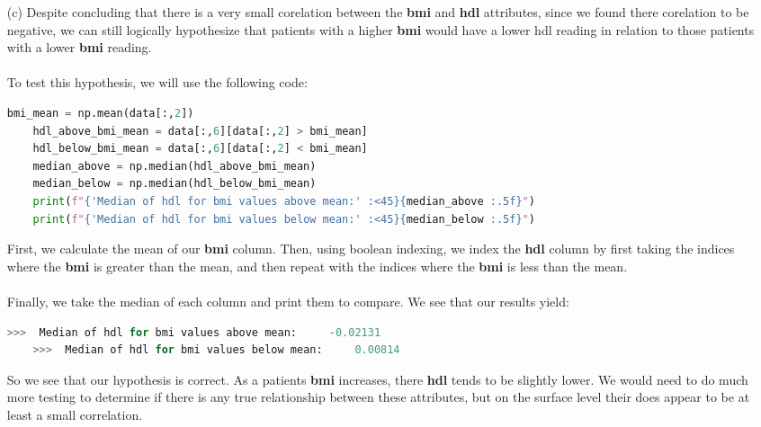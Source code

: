 \documentclass[12pt, letterpaper]{article}
\begin{document}
\begin{enumerate}
\newpage
    \item [(c)] Despite concluding that there is a very small corelation between the {\bf bmi} and {\bf hdl} attributes, 
    since we found there corelation to be negative, we can still logically hypothesize that patients with a higher 
    {\bf bmi} would have a lower hdl reading in relation to those patients with a lower {\bf bmi} reading. \\ \\
    To test this hypothesis, we will use the following code:
\begin{lstlisting}[language=python]
    bmi_mean = np.mean(data[:,2])
    hdl_above_bmi_mean = data[:,6][data[:,2] > bmi_mean]
    hdl_below_bmi_mean = data[:,6][data[:,2] < bmi_mean]
    median_above = np.median(hdl_above_bmi_mean)
    median_below = np.median(hdl_below_bmi_mean)
    print(f"{'Median of hdl for bmi values above mean:' :<45}{median_above :.5f}")
    print(f"{'Median of hdl for bmi values below mean:' :<45}{median_below :.5f}")
\end{lstlisting}
    First, we calculate the mean of our {\bf bmi} column. Then, using boolean indexing, we index the 
    {\bf hdl} column by first taking the indices where the {\bf bmi} is greater than the mean, and then 
    repeat with the indices where the {\bf bmi} is less than the mean. \\ \\
    Finally, we take the median of each column and print them to compare. We see that our results yield:
\begin{lstlisting}[language=python]
    >>>  Median of hdl for bmi values above mean:     -0.02131
    >>>  Median of hdl for bmi values below mean:     0.00814
\end{lstlisting}
    So we see that our hypothesis is correct. As a patients {\bf bmi} increases, there 
    {\bf hdl} tends to be slightly lower. We would need to do much more testing to determine
    if there is any true relationship between these attributes, but on the surface level their
    does appear to be at least a small correlation. 


\end{enumerate}
\end{document}

